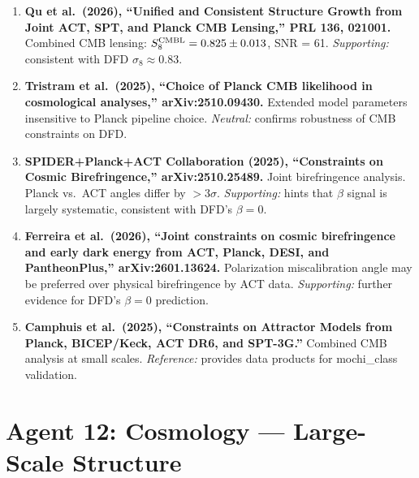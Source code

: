 \documentclass[11pt]{article}
\begin{document}
\begin{tcolorbox}[colback=green!5!white, colframe=green!50!black,
  title=\textbf{Agent 11: NEW LITERATURE REVIEWED}]

\begin{enumerate}

\item \textbf{Qu et al.\ (2026), ``Unified and Consistent Structure
  Growth from Joint ACT, SPT, and Planck CMB Lensing,'' PRL 136, 021001.}
  Combined CMB lensing: $S_8^{\rm CMBL} = 0.825 \pm 0.013$, SNR = 61.
  \emph{Supporting:} consistent with DFD $\sigma_8 \approx 0.83$.

\item \textbf{Tristram et al.\ (2025), ``Choice of Planck CMB likelihood
  in cosmological analyses,'' arXiv:2510.09430.}
  Extended model parameters insensitive to Planck pipeline choice.
  \emph{Neutral:} confirms robustness of CMB constraints on DFD.

\item \textbf{SPIDER+Planck+ACT Collaboration (2025), ``Constraints on
  Cosmic Birefringence,'' arXiv:2510.25489.}
  Joint birefringence analysis. Planck vs.\ ACT angles differ by $>3\sigma$.
  \emph{Supporting:} hints that $\beta$ signal is largely systematic,
  consistent with DFD's $\beta = 0$.

\item \textbf{Ferreira et al.\ (2026), ``Joint constraints on cosmic
  birefringence and early dark energy from ACT, Planck, DESI, and
  PantheonPlus,'' arXiv:2601.13624.}
  Polarization miscalibration angle may be preferred over physical
  birefringence by ACT data. \emph{Supporting:} further evidence
  for DFD's $\beta = 0$ prediction.

\item \textbf{Camphuis et al.\ (2025), ``Constraints on Attractor Models
  from Planck, BICEP/Keck, ACT DR6, and SPT-3G.''}
  Combined CMB analysis at small scales. \emph{Reference:} provides
  data products for mochi\_class validation.

\end{enumerate}
\end{tcolorbox}

\section{Agent 12: Cosmology --- Large-Scale Structure}
\end{document}
